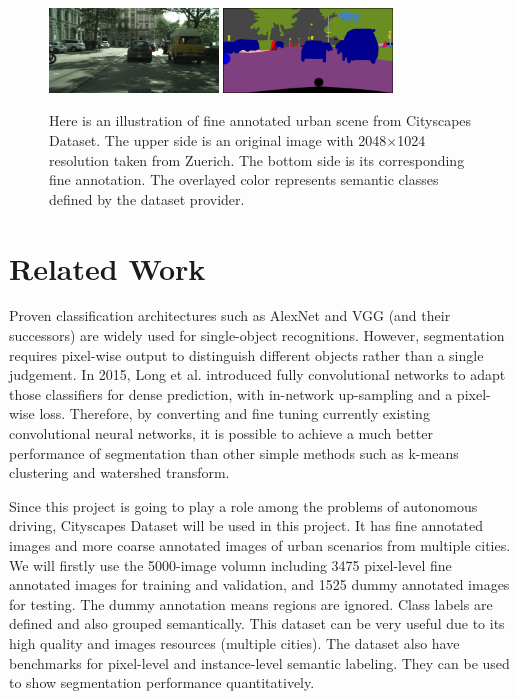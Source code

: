 \documentclass[10pt,twocolumn,letterpaper]{article}
\begin{document}
\begin{figure}[t]
\centering
\includegraphics[width=0.40\textwidth]{zurich_example.png}
\includegraphics[width=0.40\textwidth]{zurich_example_seg.png}
\caption{Here is an illustration of fine annotated urban scene from Cityscapes Dataset. The upper side is an original image with 2048$\times$1024 resolution taken from Zuerich. The bottom side is its corresponding fine annotation. The overlayed color represents semantic classes defined by the dataset provider.}
\label{fig:leadfigure}
\end{figure}

\section{Related Work}
Proven classification architectures such as AlexNet and VGG (and their successors) are widely used for single-object recognitions. However, segmentation requires pixel-wise output to distinguish different objects rather than a single judgement. In 2015, Long et al. \cite{Long_2015_CVPR} introduced fully convolutional networks to adapt those classifiers for dense prediction, with in-network up-sampling and a pixel-wise loss. Therefore, by converting and fine tuning currently existing convolutional neural networks, it is possible to achieve a much better performance of segmentation than other simple methods such as k-means clustering and watershed transform.

Since this project is going to play a role among the problems of autonomous driving, Cityscapes Dataset \cite{Cordts2016Cityscapes} will be used in this project. It has fine annotated images and more coarse annotated images of urban scenarios from multiple cities. We will firstly use the 5000-image volumn including 3475 pixel-level fine annotated images for training and validation, and 1525 dummy annotated images for testing. The dummy annotation means regions are ignored. Class labels are defined and also grouped semantically. This dataset can be very useful due to its high quality and images resources (multiple cities). The dataset also have benchmarks for pixel-level and instance-level semantic labeling. They can be used to show segmentation performance quantitatively.
\end{document}
